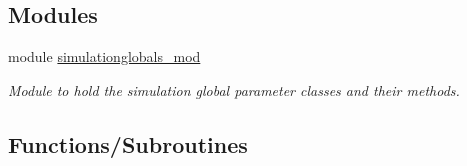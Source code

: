 \subsection*{Modules}
\begin{DoxyCompactItemize}
\item 
module \mbox{\hyperlink{namespacesimulationglobals__mod}{simulationglobals\+\_\+mod}}
\begin{DoxyCompactList}\small\item\em Module to hold the simulation global parameter classes and their methods. \end{DoxyCompactList}\end{DoxyCompactItemize}
\subsection*{Functions/\+Subroutines}

